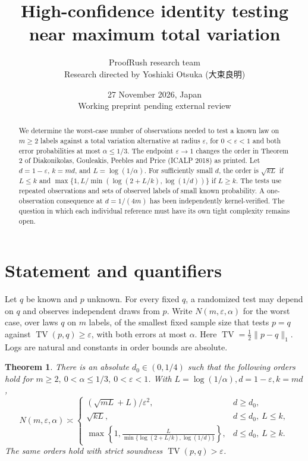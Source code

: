 \documentclass[11pt]{article}
\title{High-confidence identity testing near maximum total variation}
\author{ProofRush research team\\[2pt]\small Research directed by Yoshiaki Otsuka ({\namefont 大束良明})}
\date{27 November 2026, Japan\\\small Working preprint pending external review}
\newtheorem{theorem}{Theorem}
\newcommand{\TV}{\operatorname{TV}}
\begin{document}
\maketitle

\begin{abstract}
We determine the worst-case number of observations needed to test a known law on \(m\ge2\) labels against a total variation alternative at radius \(\varepsilon\), for \(0<\varepsilon<1\) and both error probabilities at most \(\alpha\le1/3\). The endpoint \(\varepsilon\to1\) changes the order in Theorem 2 of Diakonikolas, Gouleakis, Peebles and Price (ICALP 2018) as printed. Let \(d=1-\varepsilon\), \(k=md\), and \(L=\log(1/\alpha)\). For sufficiently small \(d\), the order is \(\sqrt{kL}\) if \(L\le k\) and \(\max\{1,L/\min(\log(2+L/k),\log(1/d))\}\) if \(L\ge k\). The tests use repeated observations and sets of observed labels of small known probability. A one-observation consequence at \(d=1/(4m)\) has been independently kernel-verified. The question in which each individual reference must have its own tight complexity remains open.
\end{abstract}

\section{Statement and quantifiers}
Let \(q\) be known and \(p\) unknown. For every fixed \(q\), a randomized test may depend on \(q\) and observes independent draws from \(p\). Write \(N(m,\varepsilon,\alpha)\) for the worst case, over laws \(q\) on \(m\) labels, of the smallest fixed sample size that tests \(p=q\) against \(\TV(p,q)\ge\varepsilon\), with both errors at most \(\alpha\). Here \(\TV=\tfrac12\|p-q\|_1\). Logs are natural and constants in order bounds are absolute.

\begin{theorem}\label{thm:main}
There is an absolute \(d_0\in(0,1/4)\) such that the following orders hold for \(m\ge2,\ 0<\alpha\le1/3,\ 0<\varepsilon<1\). With \(L=\log(1/\alpha),d=1-\varepsilon,k=md\),
\[
N(m,\varepsilon,\alpha)\asymp
\begin{cases}
(\sqrt{mL}+L)/\varepsilon^2,& d\ge d_0,\\
\sqrt{kL},& d\le d_0,\ L\le k,\\
\displaystyle\max\left\{1,\frac{L}{\min\{\log(2+L/k),\log(1/d)\}}\right\},&
d\le d_0,\ L\ge k .
\end{cases}
\]
The same orders hold with strict soundness \(\TV(p,q)>\varepsilon\).
\end{theorem}
\end{document}
